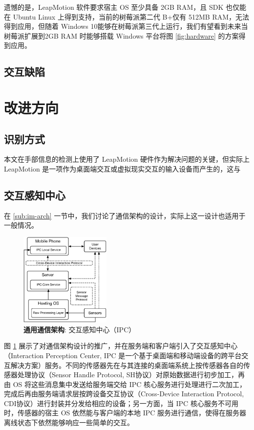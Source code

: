 遗憾的是，LeapMotion 软件要求宿主 OS 至少具备 2GB RAM，且 SDK 也仅能在 Ubuntu Linux 上得到支持，当前的树莓派第二代 B+仅有 512MB RAM，无法得到应用，但随着 Windows 10能够在树莓派第三代上运行，我们有望看到未来当树莓派扩展到2GB RAM 时能够搭载 Windows 平台将图 \ref{fig:hardware} 的方案得到应用。

\subsection{交互缺陷}

\section{改进方向}

\subsection{识别方式}

本文在手部信息的检测上使用了 LeapMotion 硬件作为解决问题的关键，但实际上 LeapMotion 是一项作为桌面端交互或虚拟现实交互的输入设备而产生的，这与

\subsection{交互感知中心}

在 \ref{sub:im-arch} 一节中，我们讨论了通信架构的设计，实际上这一设计也适用于一般情况。

\begin{figure}[H]
    \centering
    \includegraphics[width=0.4\textwidth]{figures/universe-arch}
    \caption{\kaishu \textbf{通用通信架构}: 交互感知中心（IPC）}
    \label{fig:universe-arch}
\end{figure}

图 \ref{fig:universe-arch} 展示了对通信架构设计的推广，并在服务端和客户端引入了交互感知中心（Interaction Perception Center, IPC 是一个基于桌面端和移动端设备的跨平台交互解决方案）服务\cite{Changkun:2015ipc}。不同的传感器先在与其连接的桌面端系统上按传感器各自的传感器处理协议（Sensor Handle Protocol, SH协议）对原始数据进行初步加工，再由 OS 将这些消息集中发送给服务端交给 IPC 核心服务进行处理进行二次加工，完成后再由服务端请求层按跨设备交互协议（Cross-Device Interaction Protocol, CDI协议）进行封装并分发给相应的设备；另一方面，当 IPC 核心服务不可用时，传感器的宿主 OS 依然能与客户端的本地 IPC 服务进行通信，使得在服务器离线状态下依然能够响应一些简单的交互。

